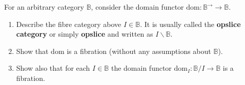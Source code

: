 \documentclass{report}
\newcommand{\bB}[0]{\mathbb B}
\renewcommand{\dom}[0]{\mathrm{dom}}
\begin{document}
\begin{exo}
    For an arbitrary category $\bB$, consider the domain functor $\dom : \bB^\rightarrow \to \bB$.
    \begin{enumerate}[label=(\roman*)]
        \item Describe the fibre category above $I\in\bB$. It is usually called the \textbf{opslice
        category} or simply \textbf{opslice} and written as $I\backslash\bB$.
        \item Show that $\dom$ is a fibration (without any assumptions about $\bB$).
        \item Show also that for each $I\in\bB$ the domain functor $\dom_I : \bB/I\to\bB$ is a
        fibration.
    \end{enumerate}
\end{exo}
\end{document}
